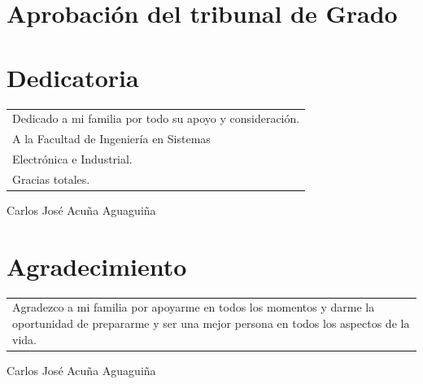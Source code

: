 \documentclass[a4paper, openright, 12pt]{report}
\begin{document}
\chapter*{Aprobación del tribunal de Grado}
{}
\newpage
\chapter*{Dedicatoria}
{}
\hfill
\begin{minipage}{0.45\textwidth}
\begin{tabular}{p{\textwidth}}
Dedicado a mi familia por todo su apoyo y consideración.\\
\bigskip
A la Facultad de Ingeniería en Sistemas\\ Electrónica e Industrial.\\
\bigskip
Gracias totales.
\end{tabular}
\end{minipage}
%
\begin{flushright}
\vfill
Carlos José Acuña Aguaguiña
\end{flushright}
\newpage
\chapter*{Agradecimiento}
{}
\hfill
\begin{minipage}{0.45\textwidth}
\begin{tabular}{p{\textwidth}}
Agradezco a mi familia por apoyarme en todos los momentos y darme la oportunidad de prepararme y ser una mejor persona en todos los aspectos de la vida.
\end{tabular}
\end{minipage}
%
\begin{flushright}
\vfill
Carlos José Acuña Aguaguiña
\end{flushright}
\newpage
%
%
\tableofcontents
\clearpage
\listoffigures
\clearpage
\listoftables
%
%
\newpage
\end{document}
